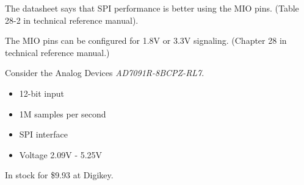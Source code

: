 \documentclass{article}
\begin{document}
The datasheet says that SPI performance is better using the MIO pins. (Table 28-2 in technical reference manual). 

The MIO pins can be configured for 1.8V or 3.3V signaling. (Chapter 28 in technical reference manual.)

Consider the Analog Devices {\em AD7091R-8BCPZ-RL7}.

\begin{itemize}
\item 12-bit input
\item 1M samples per second
\item SPI interface
\item Voltage 2.09V - 5.25V
\end{itemize}

In stock for \$9.93 at Digikey.
\end{document}
